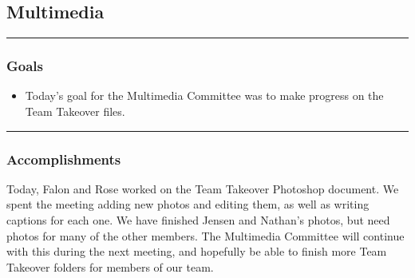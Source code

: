 \subsection*{Multimedia}
\noindent\hfil\rule{\textwidth}{.4pt}\hfil
\subsubsection*{Goals}
\begin{itemize}
    \item Today's goal for the Multimedia Committee was to make progress on the Team Takeover files.
  

\end{itemize} 

\noindent\hfil\rule{\textwidth}{.4pt}\hfil

\subsubsection*{Accomplishments}
Today, Falon and Rose worked on the Team Takeover Photoshop document. We spent the meeting adding new photos and editing them, as well as writing captions for each one. We have finished Jensen and Nathan's photos, but need photos for many of the other members. The Multimedia Committee will continue with this during the next meeting, and hopefully be able to finish more Team Takeover folders for members of our team.